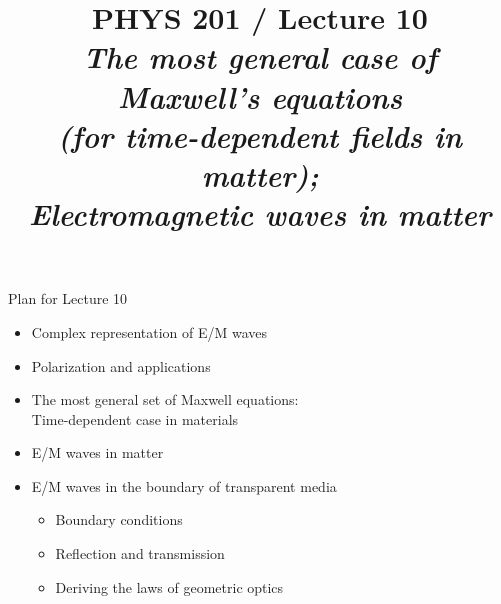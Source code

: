 \renewcommand{\prevlecture}{9 }
\renewcommand{\thislecture}{10 }
\renewcommand{\nextlecture}{11 }

%
%

\title[PHYS 201 / Lecture \thislecture]
{
  PHYS 201 / Lecture \thislecture\\
  {\it The most general case of Maxwell's equations\\
        (for time-dependent fields in matter);\\
        Electromagnetic waves in matter}\\
}



\begin{frame}[plain]
  \titlepage
\end{frame}



%
%

\renewcommand{\lecturesummarytitle}{Revision }


%
%

\begin{frame}{Plan for Lecture \thislecture}

\begin{itemize}
  \item Complex representation of E/M waves
  \item Polarization and applications
  \vspace{0.2cm}
  \item The most general set of Maxwell equations:\\
        Time-dependent case in materials
  \vspace{0.2cm}
  \item E/M waves in matter
  \item E/M waves in the boundary of transparent media
  \begin{itemize}
    \item Boundary conditions
    \item Reflection and transmission
    \item Deriving the laws of geometric optics
  \end{itemize}
\end{itemize}

\end{frame}

